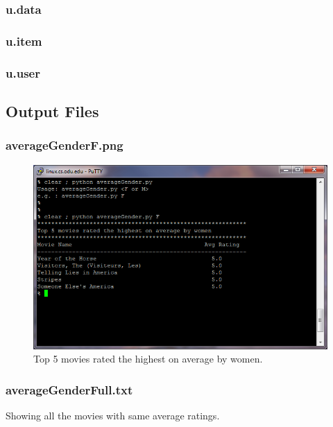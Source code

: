 \documentclass[12pt]{article}
\begin{document}
\subsubsection{u.data}

\subsubsection{u.item}

\subsubsection{u.user}

\newpage

\subsection{Output Files}
\subsubsection{averageGenderF.png}
\begin{figure}[ht]
\includegraphics[scale=1.0]{../Q3/averageGenderF}
\centering
\caption{Top 5 movies rated the highest on average by women.}
\label{fig:averageGenderF}
\end{figure}
\newpage
\subsubsection{averageGenderFull.txt}
Showing all the movies with same average ratings.

\newpage
\end{document}
